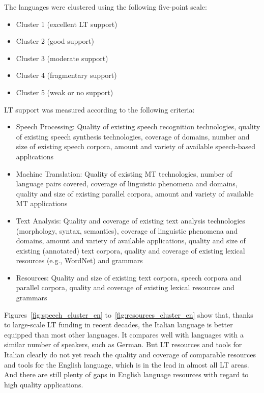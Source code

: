\documentclass[]{../../metanetpaper}
\begin{document}
\begin{multicols}{2}
The languages were clustered using the following five-point scale: 


    \begin{itemize}
      \item Cluster 1 (excellent LT support)
      \item Cluster 2 (good support)
      \item Cluster 3 (moderate support)
      \item Cluster 4 (fragmentary support) 
      \item Cluster 5 (weak or no support)
    \end{itemize}


LT support was measured according to the following criteria:


\begin{itemize}
\item Speech Processing: Quality of existing speech recognition technologies, quality of existing speech synthesis 
technologies, coverage of domains, number and size of existing speech corpora, amount and variety of available 
speech-based applications
\item Machine Translation: Quality of existing MT technologies, number of language pairs covered, 
coverage of linguistic phenomena and domains, quality and size of existing parallel corpora, amount and variety 
of available MT applications
\item Text Analysis: Quality and coverage of existing text analysis technologies (morphology, syntax, semantics), 
coverage of linguistic phenomena and domains, amount and variety of available applications, quality and size of 
existing (annotated) text corpora, quality and coverage of existing lexical resources (e.g., WordNet) and grammars
\item Resources: Quality and size of existing text corpora, speech corpora and parallel corpora, quality and coverage of existing lexical resources and grammars
\end{itemize} 



Figures~\ref{fig:speech_cluster_en} to~\ref{fig:resources_cluster_en} show that, thanks to large-scale LT funding in recent decades, the Italian language is better equipped than most other languages. It compares well with languages with a similar number of speakers, such as German. But LT resources and tools for Italian clearly do not yet reach the quality and coverage of comparable resources and tools for the English language, which is in the lead in almost all LT areas. And there are still plenty of gaps in English language resources with regard to high quality applications.


\end{multicols}
\end{document}
